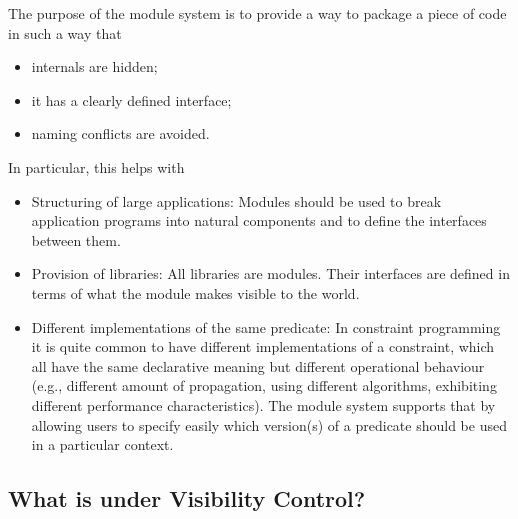 The purpose of the module system is to provide a way to package
a piece of code in such a way that
\begin{itemize}
\item internals are hidden;
\item it has a clearly defined interface;
\item naming conflicts are avoided.
\end{itemize}
In particular, this helps with
\begin{itemize}
\item Structuring of large applications:
    Modules should be used to break application programs into
    natural components and to define the interfaces between them.
\item Provision of libraries:
    All {\eclipse} libraries are modules. Their interfaces are
    defined in terms of what the module makes visible to the world.
\item Different implementations of the same predicate:
    In constraint programming it is quite common to have different
    implementations of a constraint, which all have the same declarative
    meaning but different operational behaviour (e.g., different amount of
    propagation, using different algorithms, exhibiting different
    performance characteristics). The module system supports that by
    allowing users to specify easily which version(s) of a predicate should
    be used in a particular context.
\end{itemize}


\subsection{What is under Visibility Control?}

